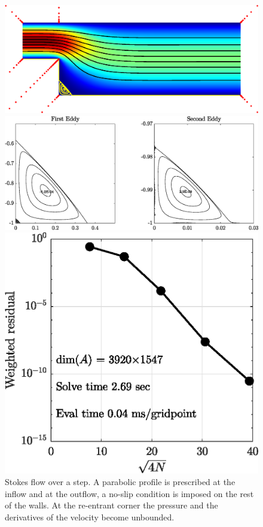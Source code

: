 \begin{figure}[H]
	\centering
	\includegraphics[width=\linewidth]{Figures/step}
	
	\vspace{2em}
	\includegraphics[width=\linewidth]{Figures/step_eddy}
	
	\vspace{2em}
	\includegraphics[width=0.5\linewidth]{Figures/step_conv}
	
	\label{fig:step}
	\caption{Stokes flow over a step. A parabolic profile is prescribed at the inflow and at the	outflow, a no-slip condition is imposed on the rest of the walls. At the re-entrant corner the pressure and the derivatives of the velocity become unbounded.}
\end{figure} 

